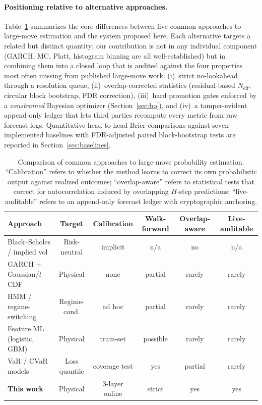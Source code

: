 \documentclass[11pt,a4paper]{article}
\begin{document}
\paragraph{Positioning relative to alternative approaches.}
Table~\ref{tab:comparison} summarizes the core differences between five common approaches to large-move estimation and the system proposed here. Each alternative targets a related but distinct quantity; our contribution is not in any individual component (GARCH, MC, Platt, histogram binning are all well-established) but in combining them into a closed loop that is audited against the four properties most often missing from published large-move work: (i)~strict no-lookahead through a resolution queue, (ii)~overlap-corrected statistics (residual-based $N_\text{eff}$, circular block bootstrap, FDR correction), (iii)~hard promotion gates enforced by a \emph{constrained} Bayesian optimizer (Section~\ref{sec:bo}), and (iv)~a tamper-evident append-only ledger that lets third parties recompute every metric from raw forecast logs. Quantitative head-to-head Brier comparisons against seven implemented baselines with FDR-adjusted paired block-bootstrap tests are reported in Section~\ref{sec:baselines}.

\begin{table}[t]
\centering
\small
\caption{Comparison of common approaches to large-move probability estimation. ``Calibration'' refers to whether the method learns to correct its own probabilistic output against realized outcomes; ``overlap-aware'' refers to statistical tests that correct for autocorrelation induced by overlapping $H$-step predictions; ``live-auditable'' refers to an append-only forecast ledger with cryptographic anchoring.}
\label{tab:comparison}
\begin{tabular}{lccccc}
\toprule
Approach & Target & Calibration & Walk-forward & Overlap-aware & Live-auditable \\
\midrule
Black--Scholes / implied vol & Risk-neutral & implicit & n/a & no & n/a \\
GARCH + Gaussian/$t$ CDF & Physical & none & partial & rarely & rarely \\
HMM / regime-switching & Regime-cond. & ad hoc & partial & rarely & rarely \\
Feature ML (logistic, GBM) & Physical & train-set & possible & rarely & rarely \\
VaR / CVaR models & Loss quantile & coverage test & yes & partial & rarely \\
\midrule
\textbf{This work} & Physical & 3-layer online & strict & yes & yes \\
\bottomrule
\end{tabular}
\end{table}
\end{document}

